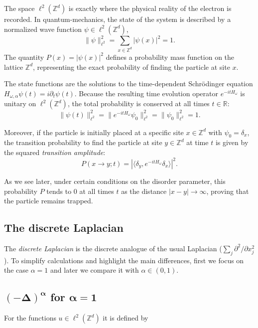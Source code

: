 \documentclass[11pt, a4paper, UKenglish, oneside]{book}
\theoremstyle{plain}
\theoremstyle{remark}
\theoremstyle{definition}
\numberwithin{equation}{section}
\numberwithin{theorem}{section}
\begin{document}
The space $\ell^2(\mathbb{Z}^d)$ is exactly where the physical reality of the electron is recorded. In quantum-mechanics, the state of the system is described by a normalized wave function $\psi \in \ell^2(\mathbb{Z}^d)$, 
\[
\|\psi\|_{\ell^2}^2 = \sum_{x \in \mathbb{Z}^d} |\psi(x)|^2 = 1.
\]
The quantity $P(x) = |\psi(x)|^2$ defines a probability mass function on the lattice $\mathbb{Z}^d$, representing the exact probability of finding the particle at site $x$. 

The state functions are the solutions to the time-dependent Schr\"odinger equation $H_{\omega, \alpha} \psi(t) = i\partial_t \psi(t)$. Because the resulting time evolution operator $e^{-itH_\omega}$ is unitary on $\ell^2(\mathbb{Z}^d)$, the total probability is conserved at all times $t \in \mathbb{R}$:
\begin{equation}
\|\psi(t)\|_{\ell^2}^2 = \|e^{-itH_\omega}\psi_0\|_{\ell^2}^2 = \|\psi_0\|_{\ell^2}^2 = 1.
\end{equation}

Moreover, if the particle is initially placed at a specific site $x \in \mathbb{Z}^d$ with $\psi_0 = \delta_x$, the transition probability to find the particle at site $y \in \mathbb{Z}^d$ at time $t$ is given by the squared \textit{transition amplitude}:
\begin{equation}
P(x \to y; t) = |\langle \delta_y, e^{-itH_\omega} \delta_x \rangle|^2.
\end{equation}

As we see later, under certain conditions on the disorder parameter, this probability $P$ tends to $0$ at all times $t$ as the distance $|x-y| \to \infty$, proving that the particle remains trapped.
\vspace{0.3 cm}

\subsection*{The  discrete Laplacian}
The \textit{discrete Laplacian} is the  discrete analogue of the usual Laplacian ($ \sum_j \partial^2/\partial x_j^2$). To simplify calculations and highlight the main differences, first we focus on the case $\alpha=1$ and later we compare it with $\alpha \in (0,1)$.
\subsection*{$\boldsymbol{(- \Delta)^{\alpha}}$ for $\boldsymbol{\alpha =1}$}
For the functions $u \in \ell^2(\mathbb{Z}^d)$ it is defined by
\end{document}
